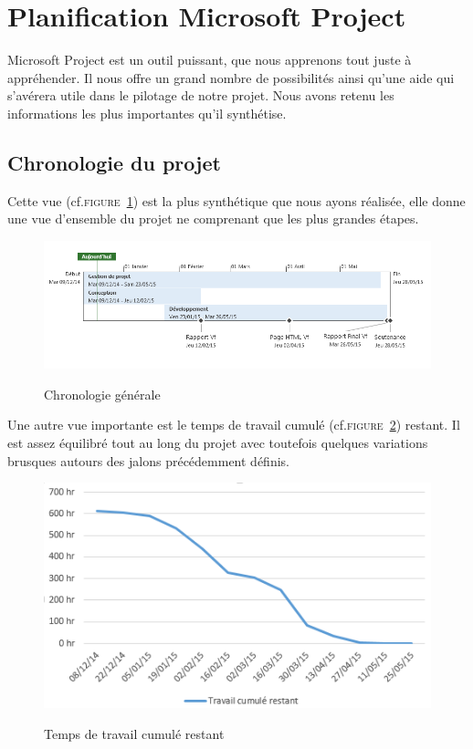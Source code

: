 \section{Planification Microsoft Project}

Microsoft Project est un outil puissant, que nous apprenons tout juste à appréhender. Il nous offre un grand nombre de possibilités ainsi qu'une aide qui s'avérera utile dans le pilotage de notre projet. Nous avons retenu les informations les plus importantes qu'il synthétise.

\subsection{Chronologie du projet}
Cette vue (cf.\textsc{figure~\ref{fig:timeline}}) est la plus synthétique que nous ayons réalisée, elle donne une vue d’ensemble du projet ne comprenant que les plus grandes étapes. 
\begin{figure}
	\centering
	\caption{Chronologie générale}
		\includegraphics[width=\textwidth]{3-Planification/img/timeline.PNG}
	\label{fig:timeline}
\end{figure}


Une autre vue importante est le temps de travail cumulé (cf.\textsc{figure~\ref{fig:avancement}}) restant. Il est assez équilibré tout au long du projet avec toutefois quelques variations brusques autours des jalons précédemment définis.
\begin{figure}
	\centering
	\caption{Temps de travail cumulé restant}
		\includegraphics[width=\textwidth]{3-Planification/img/avancement.PNG}
	\label{fig:avancement}
\end{figure}



